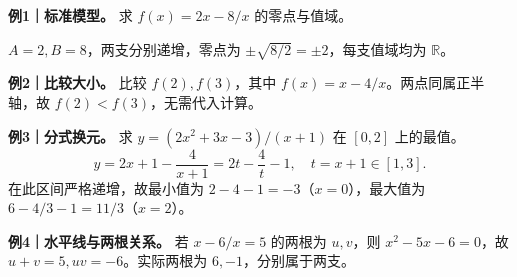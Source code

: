 \begin{examplebox}
\textbf{例1｜标准模型。} 求 $f(x)=2x-8/x$ 的零点与值域。

$A=2,B=8$，两支分别递增，零点为 $\pm\sqrt{8/2}=\pm2$，每支值域均为 $\mathbb R$。

\textbf{例2｜比较大小。} 比较 $f(2),f(3)$，其中 $f(x)=x-4/x$。两点同属正半轴，故 $f(2)<f(3)$，无需代入计算。

\textbf{例3｜分式换元。} 求 $y=(2x^2+3x-3)/(x+1)$ 在 $[0,2]$ 上的最值。
\[
 y=2x+1-\frac4{x+1}=2t-\frac4t-1,\quad t=x+1\in[1,3].
\]
在此区间严格递增，故最小值为 $2-4-1=-3$（$x=0$），最大值为 $6-4/3-1=11/3$（$x=2$）。

\textbf{例4｜水平线与两根关系。} 若 $x-6/x=5$ 的两根为 $u,v$，则 $x^2-5x-6=0$，故 $u+v=5,uv=-6$。实际两根为 $6,-1$，分别属于两支。
\end{examplebox}
